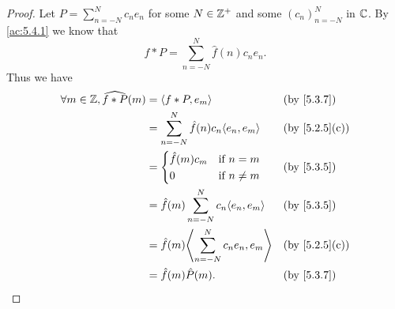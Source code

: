 \begin{proof}
  Let \(P = \sum_{n = -N}^N c_n e_n\) for some \(N \in \mathbb{Z}^+\) and some \((c_n)_{n = -N}^N\) in \(\mathbb{C}\).
  By \cref{ac:5.4.1} we know that
  \[
    f * P = \sum_{n = -N}^N \hat{f}(n) c_n e_n.
  \]
  Thus we have
  \begin{align*}
    \forall m \in \Z, \widehat{f * P}(m) & = \inner{f * P, e_m}                               &  & \text{(by \cref{5.3.7})}    \\
                                         & = \sum_{n = -N}^N \hat{f}(n) c_n \inner{e_n, e_m}  &  & \text{(by \cref{5.2.5}(c))} \\
                                         & = \begin{dcases}
                                               \hat{f}(m) c_m & \text{if } n = m    \\
                                               0              & \text{if } n \neq m
                                             \end{dcases}            &  & \text{(by \cref{5.3.5})}                             \\
                                         & = \hat{f}(m) \sum_{n = -N}^N c_n \inner*{e_n, e_m} &  & \text{(by \cref{5.3.5})}    \\
                                         & = \hat{f}(m) \inner*{\sum_{n = -N}^N c_n e_n, e_m} &  & \text{(by \cref{5.2.5}(c))} \\
                                         & = \hat{f}(m) \hat{P}(m).                           &  & \text{(by \cref{5.3.7})}
  \end{align*}


\end{proof}
